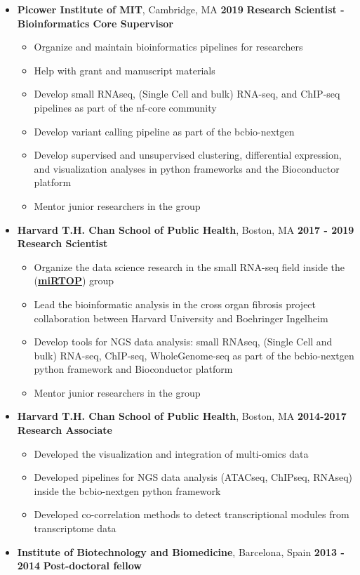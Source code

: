 \begin{itemize}
\item
\textbf{Picower Institute of MIT}, Cambridge, MA \hfill \textbf{2019}
\newline
\textbf{Research Scientist - Bioinformatics Core Supervisor}
 \begin{itemize}
\item
  Organize and maintain bioinformatics pipelines for researchers
\item
  Help with grant and manuscript materials
\item 
  Develop small RNAseq, (Single Cell and bulk) RNA-seq, and ChIP-seq pipelines
  as part of the nf-core community
\item
  Develop variant calling pipeline as part of the bcbio-nextgen
\item 
  Develop supervised and unsupervised clustering, differential expression, and visualization analyses
  in python frameworks and the Bioconductor platform
\item Mentor junior researchers in the group
 \end{itemize}

\item
  \textbf{Harvard T.H. Chan School of Public Health}, Boston, MA \hfill \textbf{2017 - 2019}
  \newline
  \textbf{Research Scientist}
 \begin{itemize}
  \item
    Organize the data science research in the small RNA-seq field inside the  (\href{https://mirtop.github.com}{\textbf{miRTOP}}) group
  \item
    Lead the bioinformatic analysis in the cross organ fibrosis project
    collaboration between Harvard University and Boehringer Ingelheim
  \item
    Develop tools for NGS data analysis: small RNAseq, (Single
    Cell and bulk) RNA-seq, ChIP-seq, WholeGenome-seq as part of the bcbio-nextgen
    python framework and Bioconductor platform
  \item Mentor junior researchers in the group
\end{itemize}

\item
  \textbf{Harvard T.H. Chan School of Public Health}, Boston, MA \hfill \textbf{2014-2017}
  \newline
  \textbf{Research Associate}

  \begin{itemize}
  \tightlist
  \item Developed the visualization and integration of multi-omics data
  \item
    Developed pipelines for NGS data analysis (ATACseq, ChIPseq, RNAseq) inside the bcbio-nextgen python framework
  \item
    Developed co-correlation methods to detect transcriptional modules from transcriptome data
  \end{itemize}
\item
  \textbf{Institute of Biotechnology and Biomedicine}, Barcelona, Spain \hfill \textbf{2013 - 2014}
  \newline
  \textbf{Post-doctoral fellow}


\end{itemize}
